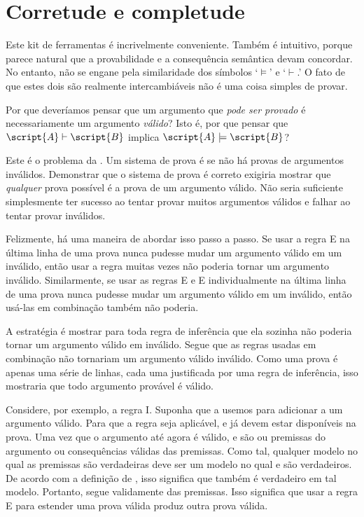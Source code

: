 \section{Corretude e completude}

Este kit de ferramentas é incrivelmente conveniente. Também é intuitivo, porque parece natural que a provabilidade e a consequência semântica devam concordar. No entanto, não se engane pela similaridade dos símbolos `$\models$' e `$\vdash$.' O fato de que estes dois são realmente intercambiáveis não é uma coisa simples de provar.

Por que deveríamos pensar que um argumento que \emph{pode ser provado} é necessariamente um argumento \emph{válido}? Isto é, por que pensar que $\script{A}\vdash\script{B}$ implica $\script{A}\models\script{B}$?

Este é o problema da . Um sistema de prova é  se não há provas de argumentos inválidos. Demonstrar que o sistema de prova é correto exigiria mostrar que \emph{qualquer} prova possível é a prova de um argumento válido. Não seria suficiente simplesmente ter sucesso ao tentar provar muitos argumentos válidos e falhar ao tentar provar inválidos.

Felizmente, há uma maneira de abordar isso passo a passo. Se usar a regra {\eand}E na última linha de uma prova nunca pudesse mudar um argumento válido em um inválido, então usar a regra muitas vezes não poderia tornar um argumento inválido. Similarmente, se usar as regras {\eand}E e {\eor}E individualmente na última linha de uma prova nunca pudesse mudar um argumento válido em um inválido, então usá-las em combinação também não poderia.

A estratégia é mostrar para toda regra de inferência que ela sozinha não poderia tornar um argumento válido em inválido. Segue que as regras usadas em combinação não tornariam um argumento válido inválido. Como uma prova é apenas uma série de linhas, cada uma justificada por uma regra de inferência, isso mostraria que todo argumento provável é válido.

Considere, por exemplo, a regra {\eand}I. Suponha que a usemos para adicionar \eand{} a um argumento válido. Para que a regra seja aplicável,  e  já devem estar disponíveis na prova. Uma vez que o argumento até agora é válido,  e  são ou premissas do argumento ou consequências válidas das premissas. Como tal, qualquer modelo no qual as premissas são verdadeiras deve ser um modelo no qual  e  são verdadeiros. De acordo com a definição de , isso significa que \eand{} também é verdadeiro em tal modelo. Portanto, \eand{} segue validamente das premissas. Isso significa que usar a regra {\eand}E para estender uma prova válida produz outra prova válida.

